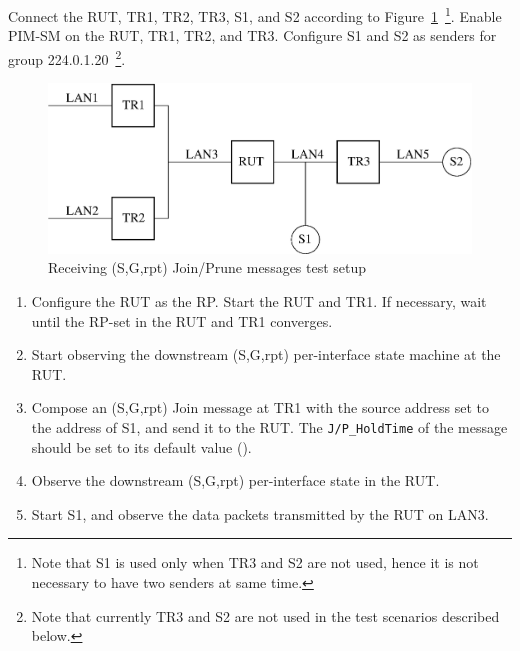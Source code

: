\documentclass[11pt]{report}
\begin{document}
Connect the RUT, TR1, TR2, TR3, S1, and S2 according to
Figure~\ref{fig:receiving_sg_rpt_join_prune_messages}~\footnote{Note that S1 is
used only when TR3 and S2 are not used, hence it is not necessary to have two
senders at same time.}.
Enable PIM-SM on the RUT, TR1, TR2, and TR3.
Configure S1 and S2 as senders for group 224.0.1.20~\footnote{Note that
currently TR3 and S2 are not used in the test scenarios described below.}.

\begin{figure}[htbp]
  \begin{center}
    \includegraphics[scale=0.8]{figs/pim_test_4_4_receiving_sg_rpt_join_prune_messages}
    \caption{Receiving (S,G,rpt) Join/Prune messages test setup}
    \label{fig:receiving_sg_rpt_join_prune_messages}
  \end{center}
\end{figure}



\begin{enumerate}

  \item Configure the RUT as the RP. Start the RUT and TR1. If
  necessary, wait until the RP-set in the RUT and TR1 converges.

  \item Start observing the downstream (S,G,rpt) per-interface state
  machine at the RUT.

  \item Compose an (S,G,rpt) Join message at TR1 with the source address set
  to the address of S1, and send it to the RUT.
  The \verb=J/P_HoldTime= of the message should be set to its default
  value ({\PimsmJPHoldTime}).

  \item Observe the downstream (S,G,rpt) per-interface state in the RUT.

  \item Start S1, and observe the data packets transmitted by the RUT on
  LAN3.

\end{enumerate}
\end{document}
